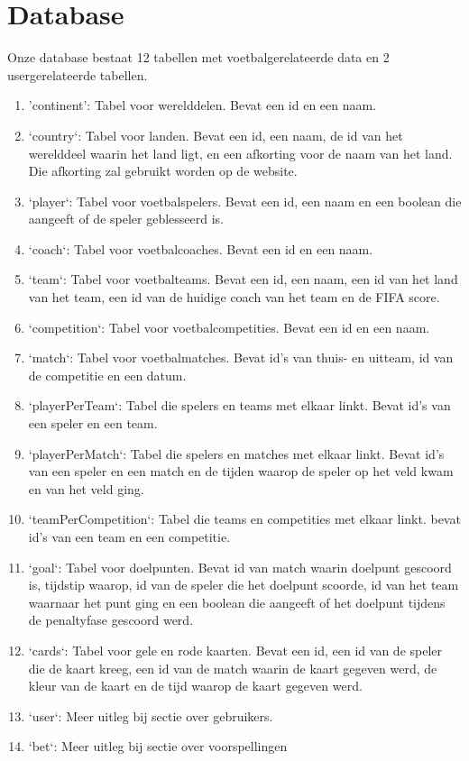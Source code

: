 \documentclass[11pt, a4paper]{article}
\begin{document}
\section{Database}
Onze database bestaat 12 tabellen met voetbalgerelateerde data en 2 usergerelateerde tabellen.
\begin{enumerate}
\item 'continent': Tabel voor werelddelen. Bevat een id en een naam.
\item `country`: Tabel voor landen. Bevat een id, een naam, de id van het werelddeel waarin het land ligt, en een afkorting voor de naam van het land. Die afkorting zal gebruikt worden op de website.
\item `player`: Tabel voor voetbalspelers. Bevat een id, een naam en een boolean die aangeeft of de speler geblesseerd is.
\item `coach`: Tabel voor voetbalcoaches. Bevat een id en een naam.
\item `team`: Tabel voor voetbalteams. Bevat een id, een naam, een id van het land van het team, een id van de huidige coach van het team en de FIFA score.
\item `competition`: Tabel voor voetbalcompetities. Bevat een id en een naam.
\item `match`: Tabel voor voetbalmatches. Bevat id's van thuis- en uitteam, id van de competitie en een datum.
\item `playerPerTeam`: Tabel die spelers en teams met elkaar linkt. Bevat id's van een speler en een team.
\item `playerPerMatch`: Tabel die spelers en matches met elkaar linkt. Bevat id's van een speler en een match en de tijden waarop de speler op het veld kwam en van het veld ging.
\item `teamPerCompetition`: Tabel die teams en competities met elkaar linkt. bevat id's van een team en een competitie.
\item `goal`: Tabel voor doelpunten. Bevat id van match waarin doelpunt gescoord is, tijdstip waarop, id van de speler die het doelpunt scoorde, id van het team waarnaar het punt ging en een boolean die aangeeft of het doelpunt tijdens de penaltyfase gescoord werd.
\item `cards`: Tabel voor gele en rode kaarten. Bevat een id, een id van de speler die de kaart kreeg, een id van de match waarin de kaart gegeven werd, de kleur van de kaart en de tijd waarop de kaart gegeven werd.
\item `user`: Meer uitleg bij sectie over gebruikers.
\item `bet`: Meer uitleg bij sectie over voorspellingen
\end{enumerate}
\end{document}
